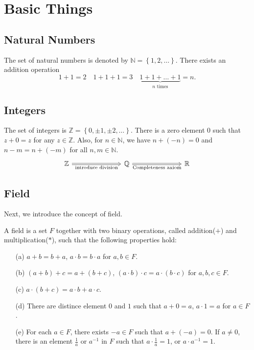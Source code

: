 \chapter{Basic Things}

\section{Natural Numbers}
The set of natural numbers is denoted by \(\mathbb{N} = \left\{ 1,2,\dots  \right\} \). There exists an addition operation 
\[
  1+1 = 2 \quad 1+1+1=3 \quad \underbrace{1+1+\dots +1}_{n \text{ times}}=n.
\] 
\section{Integers}
The set of integers is \(\mathbb{Z} = \left\{ 0, \pm 1, \pm 2, \dots  \right\} \). There is a zero element \(0\) such that \(z + 0 = z\) for any \(z \in \mathbb{Z} \). Also, for \(n \in \mathbb{N} \), we have \(n + (-n) = 0\) and \(n-m = n + (-m)\) for all \(n,m \in \mathbb{N} \).        
\[\begin{tikzcd}[sep=large]
	{\mathbb{Z}} && {\mathbb{Q}} && {\mathbb{R}}
	\arrow["{\text{introduce division}}"', Rightarrow, from=1-1, to=1-3]
	\arrow["{\text{Completeness axiom}}"', Rightarrow, from=1-3, to=1-5]
\end{tikzcd}\]
\section{Field}
Next, we introduce the concept of field. 
\begin{definition}[Fields]\label{dfn: field}
  A field is a set \(F\) together with two binary operations, called addition(\(+\)) and multiplication(\(*\)), such that the following properties hold: 
  \begin{itemize}
    \item [(a)] \(a+b=b+a\), \(a \cdot b = b \cdot a\) for \(a,b \in F\). 
    \item [(b)] \((a+b)+c=a+(b+c)\), \((a \cdot b) \cdot c = a \cdot (b \cdot c)\) for \(a,b,c \in F\). 
    \item [(c)] \(a \cdot (b + c) = a \cdot b + a \cdot c\).  
    \item [(d)] There are distince element \(0\) and \(1\) such that \(a + 0 = a\), \(a \cdot 1 = a\) for \(a \in F\). 
    \item [(e)] For each \(a \in F\), there exists \(-a \in F\) such that \(a + (-a) = 0\). If \(a \neq 0\), there is an element \(\frac{1}{a}\) or \(a^{-1} \) in \(F\) such that \(a \cdot \frac{1}{a} = 1\), or \(a \cdot a^{-1} = 1 \).         
  \end{itemize} 
\end{definition}

